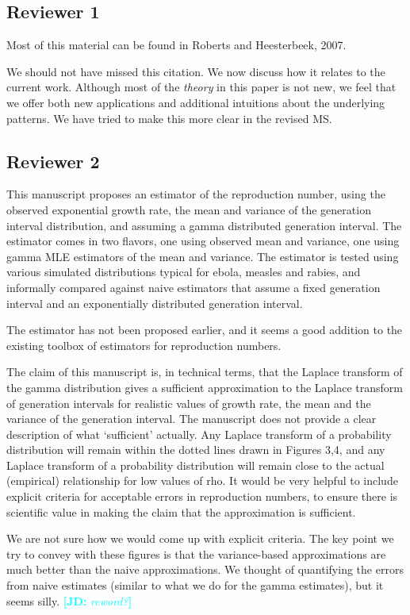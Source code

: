 \documentclass[12pt]{article}
\newcommand{\rev}{\subsection*}
\newcommand{\revtext}{\textsf}
\newcommand{\comment}[3]{\textcolor{#1}{\textbf{[#2: }\textsl{#3}\textbf{]}}}
\newcommand{\jd}[1]{\comment{cyan}{JD}{#1}}
\begin{document}
\rev{Reviewer 1}

\revtext{Most of this material can be found in Roberts and Heesterbeek, 2007.}

We should not have missed this citation. We now discuss how it relates to the current work. Although most of the \emph{theory} in this paper is not new, we feel that we offer both new applications and additional intuitions about the underlying patterns. We have tried to make this more clear in the revised MS.

\rev{Reviewer 2}

\revtext{This manuscript proposes an estimator of the reproduction number, using the observed exponential growth rate, the mean and variance of the generation interval distribution, and assuming a gamma distributed generation interval. The estimator comes in two flavors, one using observed mean and variance, one using gamma MLE estimators of the mean and variance. The estimator is tested using various simulated distributions typical for ebola, measles and rabies, and informally compared against naive estimators that assume a fixed generation interval and an exponentially distributed generation interval.}

\revtext{The estimator has not been proposed earlier, and it seems a good addition to the existing toolbox of estimators for reproduction numbers.}

\revtext{The claim of this manuscript is, in technical terms, that the Laplace transform of the gamma distribution gives a sufficient approximation to the Laplace transform of generation intervals for realistic values of growth rate, the mean and the variance of the generation interval. The manuscript does not provide a clear description of what `sufficient’ actually. Any Laplace transform of a probability distribution will remain within the dotted lines drawn in Figures 3,4, and any Laplace transform of a probability distribution will remain close to the actual (empirical) relationship for low values of rho. It would be very helpful to include explicit criteria for acceptable errors in reproduction numbers, to ensure there is scientific value in making the claim that the approximation is sufficient.}

We are not sure how we would come up with explicit criteria. The key point we try to convey with these figures is that the variance-based approximations are much better than the naive approximations. We thought of quantifying the errors from naive estimates (similar to what we do for the gamma estimates), but it seems silly. \jd{reword?}
\end{document}
